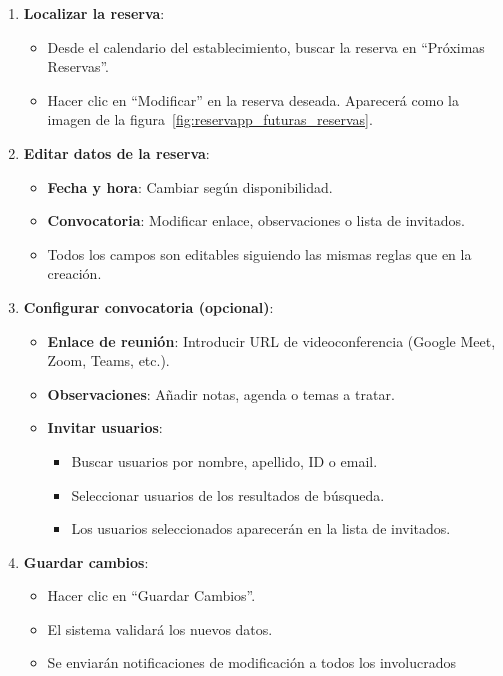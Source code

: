 \begin{enumerate}
   \item \textbf{Localizar la reserva}:
   \begin{itemize}
      \item Desde el calendario del establecimiento, buscar la reserva en ``Próximas Reservas''.
      \item Hacer clic en ``Modificar'' en la reserva deseada. Aparecerá como la imagen de la figura~\ref{fig:reservapp_futuras_reservas}.
   \end{itemize}
   \item \textbf{Editar datos de la reserva}:
   \begin{itemize}
      \item \textbf{Fecha y hora}: Cambiar según disponibilidad.
      \item \textbf{Convocatoria}: Modificar enlace, observaciones o lista de invitados.
      \item Todos los campos son editables siguiendo las mismas reglas que en la creación.
   \end{itemize}
   \item \textbf{Configurar convocatoria (opcional)}:
   \begin{itemize}
      \item \textbf{Enlace de reunión}: Introducir URL de videoconferencia (Google Meet, Zoom, Teams, etc.).
      \item \textbf{Observaciones}: Añadir notas, agenda o temas a tratar.
      \item \textbf{Invitar usuarios}:
      \begin{itemize}
         \item Buscar usuarios por nombre, apellido, ID o email.
         \item Seleccionar usuarios de los resultados de búsqueda.
         \item Los usuarios seleccionados aparecerán en la lista de invitados.
      \end{itemize}
   \end{itemize}
   \item \textbf{Guardar cambios}:
   \begin{itemize}
      \item Hacer clic en ``Guardar Cambios''.
      \item El sistema validará los nuevos datos.
	  \item Se enviarán notificaciones de modificación a todos los involucrados
   \end{itemize}
\end{enumerate}

